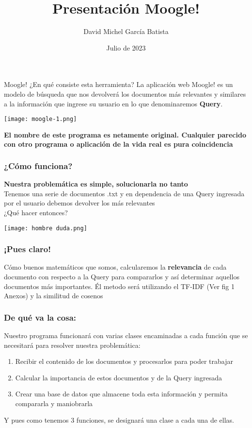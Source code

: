 \documentclass{beamer}
\title{Presentación Moogle!}
\author{David Michel García Batista}
\date{Julio de 2023}
\begin{document}
\maketitle
\begin{frame}{Moogle! ¿En qué consiste esta herramienta?}
    La aplicación web Moogle! es un modelo de búsqueda que nos devolverá los documentos más 
    relevantes y similares a la información que ingrese su usuario en lo que denominaremos \textbf{Query}.
\begin{center}
    \texttt{[image: moogle-1.png]}
\end{center}
\tiny\textbf{El nombre de este programa es netamente original. Cualquier parecido con otro programa o aplicación de la vida real es pura coincidencia}    
\end{frame}

\begin{frame}
\frametitle{¿Cómo funciona?}
\large{\textbf{Nuestra problemática es simple, solucionarla no tanto}}\\
Tenemos una serie de documentos .txt y en dependencia de una Query ingresada por el usuario debemos devolver los más relevantes\\
¿Qué hacer entonces?\\
\begin{center}
\texttt{[image: hombre duda.png]}
\end{center}
\end{frame}

\begin{frame}
    \frametitle{¡Pues claro!}
    \large{Cómo buenos matemáticos que somos, calcularemos la \textbf{relevancia} de cada documento con respecto a la Query para compararlos y así determinar aquellos documentos más importantes.
    Él metodo será utilizando el TF-IDF (Ver fig 1 Anexos) y la similitud de cosenos}
\end{frame}

\begin{frame}
    \frametitle{De qué va la cosa:}
    Nuestro programa funcionará con varias clases encaminadas a cada función que se necesitará para resolver nuestra problemática:
    \begin{enumerate}
        \item Recibir el contenido de los documentos y procesarlos para poder trabajar 
        \item Calcular la importancia de estos documentos y de la Query ingresada
        \item Crear una base de datos que almacene toda esta información y permita compararla y maniobrarla
    \end{enumerate}
    Y pues como tenemos 3 funciones, se designará una clase a cada una de ellas.
\end{frame}
\end{document}
